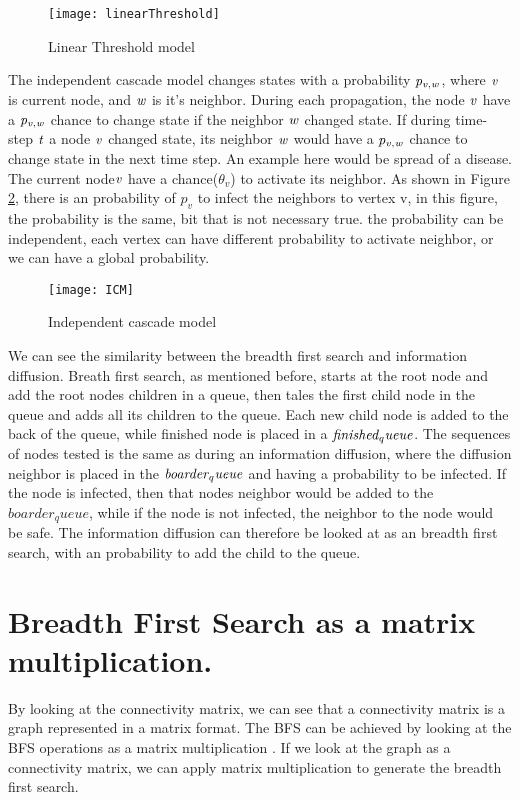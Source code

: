 \begin{figure}[!ht]
	\texttt{[image: linearThreshold]}
	\caption{Linear Threshold model} 
	\label{fig:linearThresh}
\end{figure}

The independent cascade model changes states with a probability $\it{p_{v, w}}$, where $\it{ v }$ is current node, and $\it{w}$ is it's neighbor. During each propagation, the node $\it{v}$ have a  $\it{p_{v, w}}$ chance to change state if the neighbor $\it{w}$ changed state. If during time-step $\it{t}$ a node $\it{v}$ changed state, its neighbor $\it{w}$ would have a $\it{p_{v, w}}$ chance to change state in the next time step. An example here would be spread of a disease. The current node$\it{v}$ have a chance($\theta_v$) to activate its neighbor. As shown in Figure \ref{fig:ICM}, there is an probability of $p_v$ to infect the neighbors to vertex v, in this figure, the probability is the same, bit that is not necessary true. the probability can be independent, each vertex can have different probability to activate neighbor, or we can have a global probability.

\begin{figure}[!ht]
	\texttt{[image: ICM]}
	\caption{Independent cascade model} 
	\label{fig:ICM}
\end{figure}

We can see the similarity between the breadth first search and information diffusion. Breath first search, as mentioned before, starts at the root node and add the root nodes children in a queue, then tales the first child node in the queue and adds all its children to the queue. Each new child node is added to the back of the queue, while finished node is placed in a $\it{finished_queue}$. The sequences of nodes tested is the same as during an information diffusion, where the diffusion neighbor is placed in the $ \it{boarder_queue} $ and having a probability to be infected. If the node is infected, then that nodes neighbor would be added to the $boarder_queue$, while if the node is not infected, the neighbor to the node would be safe. The information diffusion can therefore be looked at as an breadth first search, with an probability to add the child to the queue. 

\section{Breadth First Search as a matrix multiplication.}
By looking at the connectivity matrix, we can see that a connectivity matrix is a graph represented in a matrix format. The BFS can be achieved by looking at the BFS operations as a matrix multiplication \cite{algoToMath}. If we look at the graph as a connectivity matrix, we can apply matrix multiplication to generate the breadth first search. 


